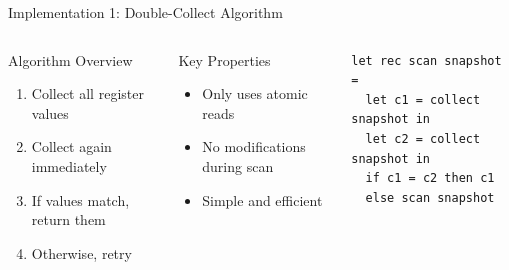 \documentclass[aspectratio=169]{beamer}
\begin{document}
\begin{frame}{Implementation 1: Double-Collect Algorithm}
    \begin{columns}[c]
        \begin{block}{Algorithm Overview}
            \begin{enumerate}
                \item Collect all register values
                \item Collect again immediately
                \item If values match, return them
                \item Otherwise, retry
            \end{enumerate}
        \end{block}

        \vspace{0.3cm}
        \begin{block}{Key Properties}
            \begin{itemize}
                \item Only uses atomic reads
                \item No modifications during scan
                \item Simple and efficient
            \end{itemize}
        \end{block}

        \begin{lstlisting}[caption=Double-Collect Scan]
let rec scan snapshot =
  let c1 = collect snapshot in
  let c2 = collect snapshot in
  if c1 = c2 then c1
  else scan snapshot
        \end{lstlisting}
    \end{columns}
\end{frame}
\end{document}
